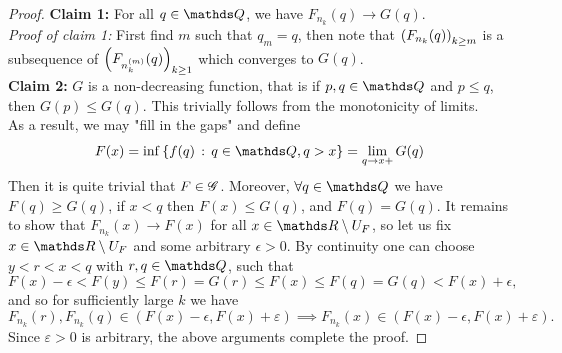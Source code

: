 \begin{proof}
\textbf{Claim 1:} For all $q \in \Q$, we have $F_{n_k}(q) \to G(q)$.\\

\textit{Proof of claim 1:} First find $m$ such that $q_m = q$, then note that $\left( F_{n_k}(q) \right)_{k\geq m}$ is a subsequence of $\left( F_{n_k^{(m)}}(q) \right)_{k\geq 1}$ which converges to $G(q)$. \\

\textbf{Claim 2:} $G$ is a non-decreasing function, that is if $p, q \in \Q$ and $p \leq q$, then $G(p) \leq G(q)$. This trivially follows from the monotonicity of limits.\\

As a result, we may "fill in the gaps" and define 
\begin{equation}
    F(x) = \inf \set{f(q) \,:\, q \in \Q, q > x} = \lim_{q \to x+} G(q)
\end{equation}
Then it is quite trivial that $F \in \mathcal{G}$. Moreover, $\forall q \in \Q$ we have $F(q) \geq G(q)$, if $x < q$ then $F(x) \leq G(q)$, and $F(q) = G(q)$. It remains to show that $F_{n_k}(x) \to F(x)$ for all $x \in \R \setminus U_F$, so let us fix $x \in \R \setminus U_F$ and some arbitrary $\epsilon > 0$. By continuity one can choose $y < r < x < q$ with $r,q \in \Q$, such that
\begin{equation*}
F(x) - \epsilon < F(y) \leq F(r) = G(r) \leq F(x) \leq F(q) = G(q) < F(x) + \epsilon,
\end{equation*}
and so for sufficiently large $k$ we have
\begin{equation*}
F_{n_k}(r), F_{n_k}(q) \in (F(x)-\epsilon, F(x)+\varepsilon) \implies F_{n_k}(x) \in (F(x)-\epsilon, F(x)+\varepsilon).
\end{equation*}
Since $\varepsilon > 0$ is arbitrary, the above arguments complete the proof.
\end{proof}

